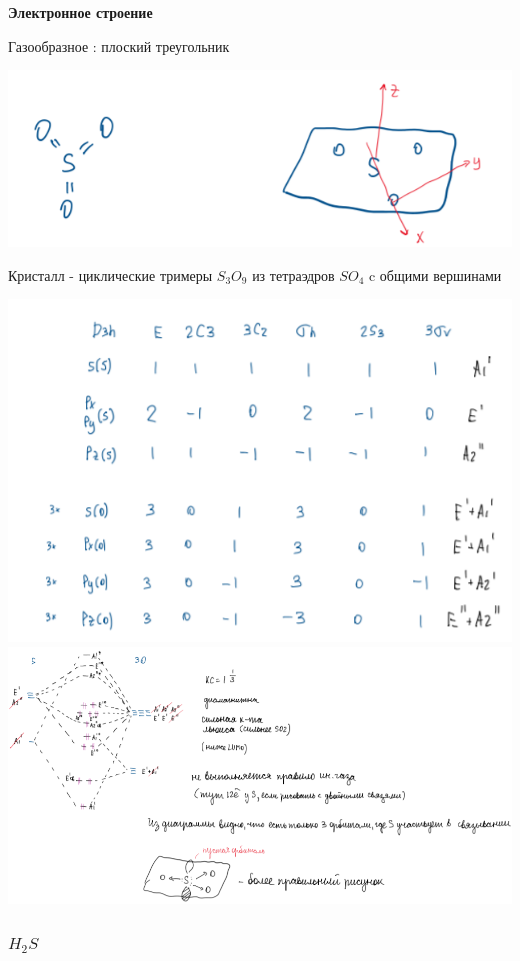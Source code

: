 \documentclass[14pt,a4paper]{scrartcl}
\begin{document}
\textbf{Электронное строение}

Газообразное : плоский треугольник

\includegraphics{7v3.png}

Кристалл - циклические тримеры $S_3O_9$ из тетраэдров $SO_4$ c общими вершинами

\includegraphics{7v4.png}\\
\includegraphics{7v5.png}

\subsubsection{$H_2S$}
\end{document}
